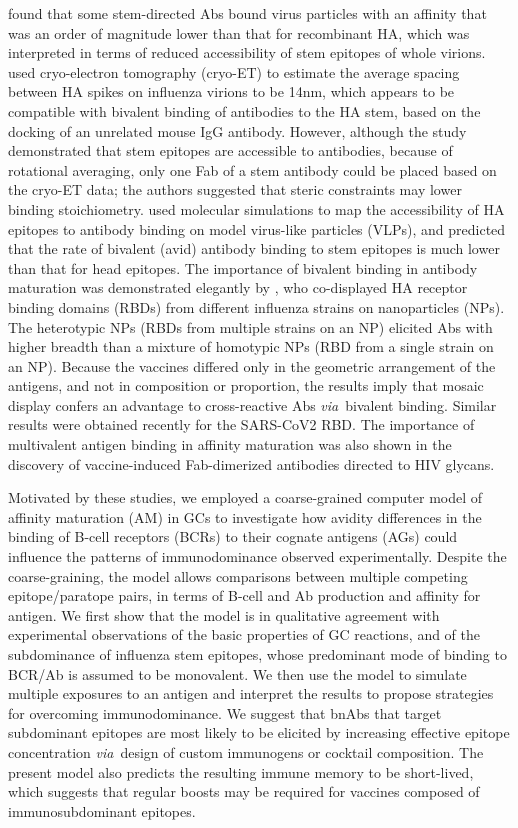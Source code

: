 \documentclass[utf8]{frontiersHLTH}%
\newcommand{\cred}[1]{\textsf{\color{red}#1}}
\def\via {{\it via}}
\begin{document}
\citet{andrews15} found that some stem-directed Abs bound
virus particles with an affinity that was an order of magnitude lower than that for
recombinant HA, which was interpreted in terms of reduced accessibility of
stem epitopes of whole virions.
%
\cred{\citet{harris13} used cryo-electron tomography (cryo-ET) to estimate the 
average spacing between HA spikes on influenza virions to be 14nm, which
appears to be compatible with bivalent binding of antibodies to the HA
stem, based on the docking of an unrelated mouse IgG antibody.\cite{harris13}
However, although the study demonstrated that stem epitopes are
accessible to antibodies, because of rotational averaging, only one Fab
of a stem antibody could be placed based on the cryo-ET data; the authors suggested 
that steric constraints may lower binding stoichiometry.}
%
\citet{amitai20} used molecular simulations to map the accessibility
of HA epitopes to antibody binding on model virus-like particles (VLPs),
and predicted that the rate of bivalent (avid) antibody binding to stem
epitopes is much lower than that for head epitopes.
The importance of bivalent binding in antibody maturation was
demonstrated elegantly by \citet{kanekiyo19}, who co-displayed HA
receptor binding domains (RBDs) from different influenza strains on
nanoparticles (NPs). The heterotypic NPs (RBDs from multiple strains on an NP)
elicited Abs with higher breadth than a mixture of homotypic NPs (RBD from a single
strain on an NP). Because the vaccines differed only in the geometric
arrangement of the antigens, and not in composition or proportion, the results imply
that mosaic display confers an advantage to cross-reactive Abs
\via~bivalent binding\cite{kanekiyo19}. Similar results were obtained recently for the
SARS-CoV2 RBD.\cite{cohen21}
%
\cred{The importance of multivalent antigen binding in affinity maturation was
also shown in the discovery of vaccine-induced Fab-dimerized antibodies
directed to HIV glycans.\cite{williams21}}

Motivated by these studies, we employed a coarse-grained computer model
of affinity maturation (AM) in GCs to investigate how avidity
differences in the binding of B-cell receptors (BCRs) to their cognate antigens
(AGs) could influence the patterns of immunodominance observed
experimentally. Despite the coarse-graining, the model allows
comparisons between multiple competing epitope/paratope pairs,
in terms of B-cell and Ab production and affinity for antigen. We first show
that the model is in qualitative agreement with experimental observations of
the basic properties of GC reactions,
and of the subdominance of influenza stem epitopes, whose predominant mode of binding to BCR/Ab
is assumed to be monovalent.
We then use the model to simulate multiple exposures to an antigen
and interpret the results to propose strategies for
overcoming immunodominance. We suggest that bnAbs that target subdominant
epitopes are most likely to be elicited by increasing effective epitope
concentration \via~design of custom immunogens or cocktail composition.
The present model also predicts the resulting immune memory to be
short-lived, which suggests that regular boosts may be required for vaccines
composed of immunosubdominant epitopes.
\end{document}
